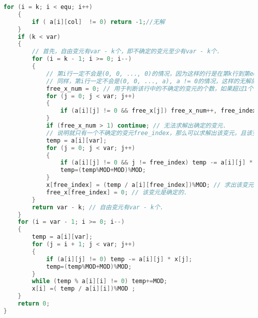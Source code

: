 \begin{lstlisting}[language=C++]
    for (i = k; i < equ; i++)
    { 
        if ( a[i][col]  != 0) return -1;//无解
    }
    if (k < var)
    {
        // 首先，自由变元有var - k个，即不确定的变元至少有var - k个.
        for (i = k - 1; i >= 0; i--)
        {
            // 第i行一定不会是(0, 0, ..., 0)的情况，因为这样的行是在第k行到第equ行.
            // 同样，第i行一定不会是(0, 0, ..., a), a != 0的情况，这样的无解的.
            free_x_num = 0; // 用于判断该行中的不确定的变元的个数，如果超过1个，则无法求解，它们仍然为不确定的变元.
            for (j = 0; j < var; j++)
            {
                if (a[i][j] != 0 && free_x[j]) free_x_num++, free_index = j;
            }
            if (free_x_num > 1) continue; // 无法求解出确定的变元.
            // 说明就只有一个不确定的变元free_index，那么可以求解出该变元，且该变元是确定的.
            temp = a[i][var];
            for (j = 0; j < var; j++)
            {
                if (a[i][j] != 0 && j != free_index) temp -= a[i][j] * x[j]%MOD;
                temp=(temp%MOD+MOD)%MOD;
            }
            x[free_index] = (temp / a[i][free_index])%MOD; // 求出该变元.
            free_x[free_index] = 0; // 该变元是确定的.
        }
        return var - k; // 自由变元有var - k个.
    }
    for (i = var - 1; i >= 0; i--)
    {
        temp = a[i][var];
        for (j = i + 1; j < var; j++)
        {
            if (a[i][j] != 0) temp -= a[i][j] * x[j];
            temp=(temp%MOD+MOD)%MOD;
        }
        while (temp % a[i][i] != 0) temp+=MOD;
        x[i] =( temp / a[i][i])%MOD ;
    }
    return 0;
}
\end{lstlisting}
